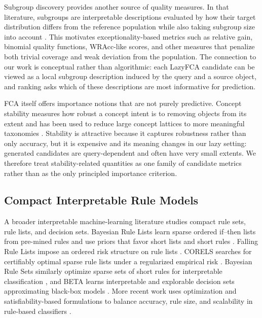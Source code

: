 \documentclass[11pt]{article}
\begin{document}
Subgroup discovery provides another source of quality measures. In that
literature, subgroups are interpretable descriptions evaluated by how their
target distribution differs from the reference population while also taking
subgroup size into account \cite{atzmueller2005exploiting}. This motivates
exceptionality-based metrics such as relative gain, binomial quality
functions, WRAcc-like scores, and other measures that penalize both trivial
coverage and weak deviation from the population. The connection to our work
is conceptual rather than algorithmic: each LazyFCA candidate can be viewed as
a local subgroup description induced by the query and a source object, and
ranking asks which of these descriptions are most informative for prediction.

FCA itself offers importance notions that are not purely predictive. Concept
stability measures how robust a concept intent is to removing objects from
its extent and has been used to reduce large concept lattices to more
meaningful taxonomies \cite{kuznetsov2009concept}. Stability is attractive
because it captures robustness rather than only accuracy, but it is expensive
and its meaning changes in our lazy setting: generated candidates are
query-dependent and often have very small extents. We therefore treat
stability-related quantities as one family of candidate metrics rather than
as the only principled importance criterion.

\subsection{Compact Interpretable Rule Models}

A broader interpretable machine-learning literature studies compact rule
sets, rule lists, and decision sets. Bayesian Rule Lists learn sparse ordered
if--then lists from pre-mined rules and use priors that favor short lists and
short rules \cite{letham2015interpretable}. Falling Rule Lists impose an
ordered risk structure on rule lists \cite{wang2015falling}. CORELS searches
for certifiably optimal sparse rule lists under a regularized empirical risk
\cite{angelino2018learning}. Bayesian Rule Sets similarly optimize sparse
sets of short rules for interpretable classification \cite{7837984}, and BETA
learns interpretable and explorable decision sets approximating black-box
models \cite{lakkaraju2017interpretable}. More recent work uses optimization
and satisfiability-based formulations to balance accuracy, rule size, and
scalability in rule-based classifiers \cite{ghosh2022efficient}.
\end{document}
